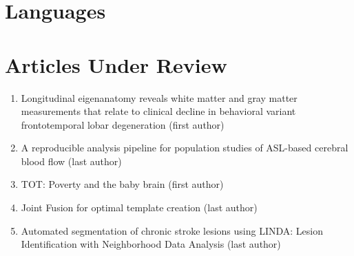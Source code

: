 \documentclass[11pt]{moderncv} %
\begin{document}
\section{Languages}



\section{Articles Under Review}

\begin{enumerate}
\item Longitudinal eigenanatomy reveals white matter and gray matter
  measurements that relate to clinical decline in behavioral variant
  frontotemporal lobar degeneration (first author)
\item A reproducible analysis pipeline for population studies of ASL-based cerebral blood flow (last author)
\item TOT: Poverty and the baby brain (first author)
\item Joint Fusion for optimal template creation (last author)
\item Automated segmentation of chronic stroke lesions using LINDA: Lesion Identification with Neighborhood Data Analysis (last author)
\end{enumerate}
\end{document}

